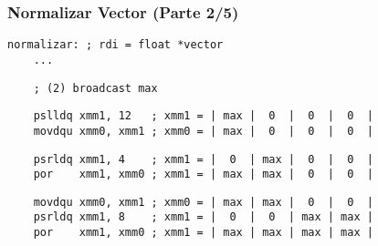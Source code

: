 \documentclass[aspectratio=169]{beamer}
\begin{document}
\begin{frame}[fragile,t]
    \frametitle{Normalizar Vector (Parte 2/5)}
    \footnotesize
    \begin{verbatim}
normalizar: ; rdi = float *vector
    ...
    \end{verbatim}
    \small
    \begin{verbatim}
    ; (2) broadcast max
    \end{verbatim}
    \vspace{-1cm}
    \begin{verbatim}
    pslldq xmm1, 12   ; xmm1 = | max |  0  |  0  |  0  |
    movdqu xmm0, xmm1 ; xmm0 = | max |  0  |  0  |  0  |
    \end{verbatim}
    \vspace{-1cm} \pause
    \begin{verbatim}
    psrldq xmm1, 4    ; xmm1 = |  0  | max |  0  |  0  |
    por    xmm1, xmm0 ; xmm1 = | max | max |  0  |  0  |
    \end{verbatim}
    \vspace{-1cm} \pause
    \begin{verbatim}
    movdqu xmm0, xmm1 ; xmm0 = | max | max |  0  |  0  |
    psrldq xmm1, 8    ; xmm1 = |  0  |  0  | max | max |
    por    xmm1, xmm0 ; xmm1 = | max | max | max | max |
    \end{verbatim}
\end{frame}
\end{document}

